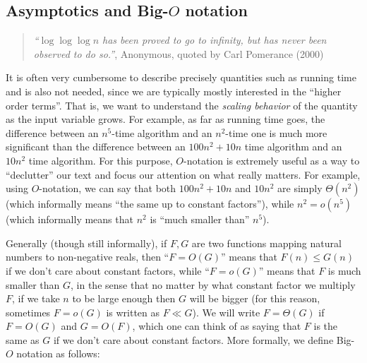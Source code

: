 \subsection{Asymptotics and Big-\(O\) notation}\label{secbigohnotation}

\begin{quote}
\emph{``\(\log\log\log n\) has been proved to go to infinity, but has
never been observed to do so.''}, Anonymous, quoted by Carl Pomerance
(2000)
\end{quote}

It is often very cumbersome to describe precisely quantities such as
running time and is also not needed, since we are typically mostly
interested in the ``higher order terms''. That is, we want to understand
the \emph{scaling behavior} of the quantity as the input variable grows.
For example, as far as running time goes, the difference between an
\(n^5\)-time algorithm and an \(n^2\)-time one is much more significant
than the difference between an \(100n^2 + 10n\) time algorithm and an
\(10n^2\) time algorithm. For this purpose, \(O\)-notation is extremely
useful as a way to ``declutter'' our text and focus our attention on
what really matters. For example, using \(O\)-notation, we can say that
both \(100n^2 + 10n\) and \(10n^2\) are simply \(\Theta(n^2)\) (which
informally means ``the same up to constant factors''), while
\(n^2 = o(n^5)\) (which informally means that \(n^2\) is ``much smaller
than'' \(n^5\)).

Generally (though still informally), if \(F,G\) are two functions
mapping natural numbers to non-negative reals, then ``\(F=O(G)\)'' means
that \(F(n) \leq G(n)\) if we don't care about constant factors, while
``\(F=o(G)\)'' means that \(F\) is much smaller than \(G\), in the sense
that no matter by what constant factor we multiply \(F\), if we take
\(n\) to be large enough then \(G\) will be bigger (for this reason,
sometimes \(F=o(G)\) is written as \(F \ll G\)). We will write
\(F= \Theta(G)\) if \(F=O(G)\) and \(G=O(F)\), which one can think of as
saying that \(F\) is the same as \(G\) if we don't care about constant
factors. More formally, we define Big-\(O\) notation as follows:

\hypertarget{bigohdef}{}


